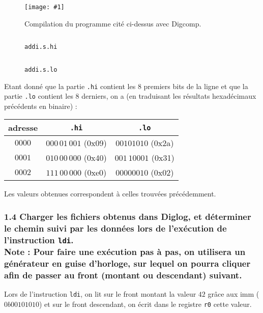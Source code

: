 \documentclass[twoside, 12pt, a4paper]{article}
\newcommand{\cf}[3]{
    \begin{figure}[!h]
        \centering
        \texttt{[image: \#1]}
    \caption{#3}\label{Fig:#1}
    \end{figure}
}
\newcommand{\hcf}[2]{\cf{#1}{.75}{#2}}
\begin{document}
    \hcf{compil_addi.png}{Compilation du programme cité ci-dessus avec Digcomp.}

\begin{figure}[!h]
   \begin{minipage}{0.48\textwidth}
     \centering
     \inputminted[]{text}{../asm/ex1/addi.s.hi}
     \caption{\texttt{addi.s.hi}}
     \label{fig:addi.s.hi}
   \end{minipage}\hfill
   \begin{minipage}{0.48\textwidth}
     \centering    
     \inputminted[]{text}{../asm/ex1/addi.s.lo}
     \caption{\texttt{addi.s.lo}}
     \label{fig:addi.s.lo}
   \end{minipage}
\end{figure}

    Etant donné que la partie \texttt{.hi} contient les 8 premiers bits de la ligne et que la partie \texttt{.lo} contient les 8 derniers, on a (en traduisant les résultats hexadécimaux précédents en binaire) :
    \begin{center}
        \begin{tabular}{|c|c|c|}
            \hline
            adresse & \texttt{.hi} & \texttt{.lo} \\
            \hline
             $0000$ & $000\,01\,001$ (0x09) & $00101010$ (0x2a)\\
             $0001$ & $010\,00\,000$ (0x40) & $001\,10001$ (0x31)\\
             $0002$ & $111\,00\,000$ (0xe0) & $00000010$ (0x02)\\ 
             \hline
        \end{tabular}
    \end{center}

    Les valeurs obtenues correspondent à celles trouvées précédemment.

        \subsubsection*{\textbf{1.4} Charger les fichiers obtenus dans Diglog, et déterminer le chemin suivi par les données lors de l’exécution de l’instruction \texttt{ldi}. \\
        \textbf{Note :} Pour faire une exécution pas à pas, on utilisera un générateur en guise d'horloge, sur lequel on pourra cliquer afin de passer au front (montant ou descendant) suivant.}

Lors de l'instruction \texttt{ldi}, on lit sur le front montant la valeur $42$ grâce aux imm ($0b00101010$) et sur le front descendant, on écrit dans le registre \texttt{r0} cette valeur. 
\end{document}
